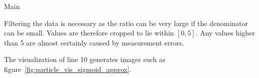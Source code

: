 \begin{algorithm}[H] \label{alg:main}
	\SetAlgoLined
	\DontPrintSemicolon
	\LinesNumbered
	\caption{Main}
	
	
	\BlankLine
\end{algorithm}
\vspace{1cm}

Filtering the data is necessary as the ratio can be very large if the denominator can be small. Values are therefore cropped to lie within $[0, 5]$. Any values higher than 5 are almost certainly caused by measurement errors.

The visualization of line 10 generates images such as figure~\ref{fig:particle_vis_sigmoid_approx}.

